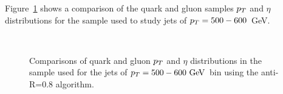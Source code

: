 Figure~\ref{fig:qg_pt500_basics_AKt_R08} shows a comparison of the quark and gluon samples
$p_T$ and $\eta$ distributions for the sample used to study jets of $p_T=500-600$~GeV. 
\begin{figure}
\begin{center}
\\
\caption{Comparisons of quark and gluon $p_T$ and $\eta$ 
distributions in the sample used for the jets of $\pt=500-600 \GeV$ bin using the anti-\kT R=0.8 algorithm.}
\label{fig:qg_pt500_basics_AKt_R08}
\end{center}
\end{figure}
